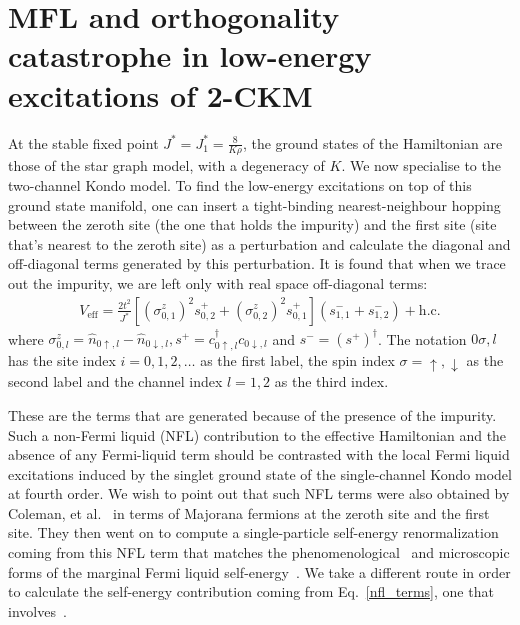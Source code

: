 \documentclass[12pt]{revtex4-2}
\begin{document}
\section{MFL and orthogonality catastrophe in low-energy excitations of 2-CKM}
At the stable fixed point \(J ^* = J_1^* = \frac{8}{K \rho}\), the ground states of the Hamiltonian are those of the star graph model, with a degeneracy of \(K\). We now specialise to the two-channel Kondo model. To find the low-energy excitations on top of this ground state manifold, one can insert a tight-binding nearest-neighbour hopping between the zeroth site (the one that holds the impurity) and the first site (site that's nearest to the zeroth site) as a perturbation and calculate the diagonal and off-diagonal terms generated by this perturbation. It is found that when we trace out the impurity, we are left only with real space off-diagonal terms:
\begin{equation}\begin{aligned}
	\label{nfl_terms}
	V_\text{eff} = \frac{2t^2}{J^*}\left[\left(\sigma^z_{0,1}\right)^2 s^+_{0,2} + \left(\sigma^z_{0,2}\right)^2 s^+_{0,1}\right] \left(s^-_{1,1} + s^-_{1,2}\right) + \text{h.c.}
\end{aligned}\end{equation}
where \(\sigma^z_{0,l} = \hat n_{0\uparrow,l} - \hat n_{0\downarrow,l}, s^+ = c^\dagger_{0 \uparrow,l}c_{0 \downarrow,l}\) and \(s^- = \left(s^+\right)^\dagger\). The notation \(0\sigma,l\) has the site index \(i=0,1,2,\ldots\) as the first label, the spin index \(\sigma=\uparrow,\downarrow\) as the second label and the channel index \(l=1,2\) as the third index.

These are the terms that are generated because of the presence of the impurity. Such a non-Fermi liquid (NFL) contribution to the effective Hamiltonian and the absence of any Fermi-liquid term should be contrasted with the local Fermi liquid excitations induced by the singlet ground state of the single-channel Kondo model at fourth order. We wish to point out that such NFL terms were also obtained by Coleman, et al.~\cite{Coleman_tsvelik} in terms of Majorana fermions at the zeroth site and the first site. They then went on to compute a single-particle self-energy renormalization coming from this NFL term that matches the phenomenological~\cite{varma2002singular} and microscopic forms of the marginal Fermi liquid self-energy~\cite{anirbanmott1,anirbanurg1}. We take a different route in order to calculate the self-energy contribution coming from Eq.~\ref{nfl_terms}, one that involves~\cite{anirbanmott1}.
\end{document}
